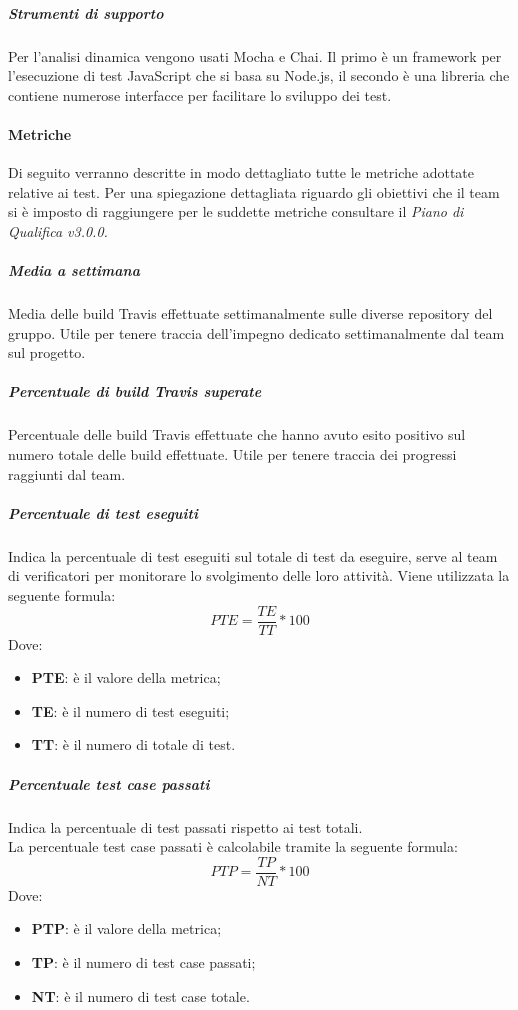 \subparagraph{Strumenti di supporto} \Spazio
Per l'analisi dinamica vengono usati Mocha e Chai. Il primo è un framework  per l'esecuzione di test JavaScript che si basa su Node.js, il secondo è una libreria che contiene numerose interfacce per facilitare lo sviluppo dei test.

\paragraph{Metriche}  \Spazio
Di seguito verranno descritte in modo dettagliato tutte le metriche adottate relative ai test. Per una spiegazione dettagliata riguardo gli obiettivi che il team si è imposto di raggiungere per le suddette metriche consultare il \emph{Piano di Qualifica v3.0.0.}

\subparagraph{Media   a settimana}\Spazio
Media delle build Travis effettuate settimanalmente sulle diverse repository del gruppo. Utile per tenere traccia dell'impegno dedicato settimanalmente dal team sul progetto.
\subparagraph{Percentuale di build Travis superate}\Spazio
Percentuale delle build Travis effettuate che hanno avuto esito positivo sul numero totale delle build effettuate. Utile per tenere traccia dei progressi raggiunti dal team.
\subparagraph{Percentuale di test eseguiti}\Spazio
Indica la percentuale di test eseguiti sul totale di test da eseguire, serve al team di verificatori per monitorare lo svolgimento delle loro attività.
Viene utilizzata la seguente formula:
$$PTE=\frac{TE}{TT}*100$$
Dove:
\begin{itemize}
	\item{\textbf{PTE}: è il valore della metrica;}
	\item{\textbf{TE}: è il numero di test eseguiti;}
	\item{\textbf{TT}: è il numero di totale di test.}
\end{itemize}

\subparagraph{Percentuale test case passati}\Spazio
Indica la percentuale di test passati rispetto ai test totali.\\
La percentuale test case passati è calcolabile tramite la seguente formula:
$$PTP=\frac{TP}{NT}*100$$
Dove:
\begin{itemize}
	\item{\textbf{PTP}: è il valore della metrica;}
	\item{\textbf{TP}: è il numero di test case passati;}
	\item{\textbf{NT}: è il numero di test case totale.}
\end{itemize}


